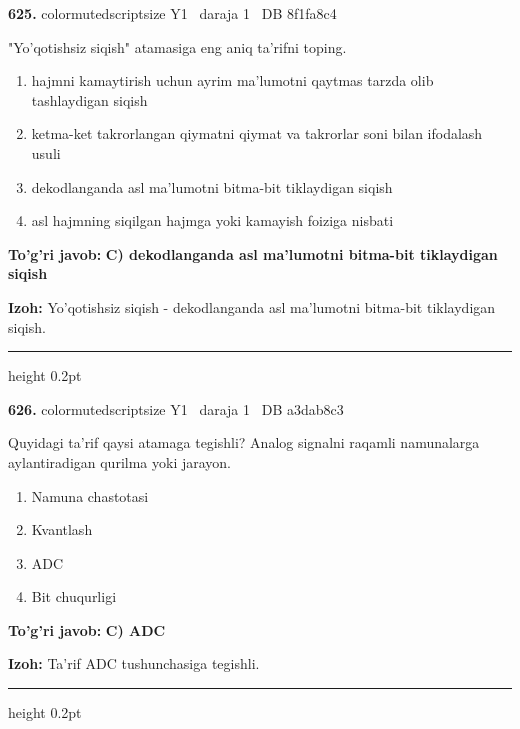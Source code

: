 \documentclass[10pt,a4paper,oneside]{article}
\begin{document}
\noindent\textbf{\color{ink}625.}  {color{muted}scriptsize Y1 \textbullet\ daraja 1 \textbullet\ DB 8f1fa8c4}
\par
"Yo'qotishsiz siqish" atamasiga eng aniq ta'rifni toping.
\begin{enumerate}[label=\Alph*),leftmargin=9mm]
\item hajmni kamaytirish uchun ayrim ma'lumotni qaytmas tarzda olib tashlaydigan siqish
\item ketma-ket takrorlangan qiymatni qiymat va takrorlar soni bilan ifodalash usuli
\item dekodlanganda asl ma'lumotni bitma-bit tiklaydigan siqish
\item asl hajmning siqilgan hajmga yoki kamayish foiziga nisbati
\end{enumerate}
\begin{tcolorbox}[enhanced,breakable,colback=teal!4,colframe=teal!50!black,boxrule=0.5pt,arc=1.1mm,left=3mm,right=3mm,top=1.7mm,bottom=1.7mm,before skip=2mm,after skip=2mm]
\textbf{\color{teal}To'g'ri javob:} \textbf{C) dekodlanganda asl ma'lumotni bitma-bit tiklaydigan siqish}
\par\smallskip
\textbf{Izoh:} Yo'qotishsiz siqish - dekodlanganda asl ma'lumotni bitma-bit tiklaydigan siqish.
\end{tcolorbox}
\vspace{2mm}\hrule height 0.2pt \vspace{3mm}

\noindent\textbf{\color{ink}626.}  {color{muted}scriptsize Y1 \textbullet\ daraja 1 \textbullet\ DB a3dab8c3}
\par
Quyidagi ta'rif qaysi atamaga tegishli? Analog signalni raqamli namunalarga aylantiradigan qurilma yoki jarayon.
\begin{enumerate}[label=\Alph*),leftmargin=9mm]
\item Namuna chastotasi
\item Kvantlash
\item ADC
\item Bit chuqurligi
\end{enumerate}
\begin{tcolorbox}[enhanced,breakable,colback=teal!4,colframe=teal!50!black,boxrule=0.5pt,arc=1.1mm,left=3mm,right=3mm,top=1.7mm,bottom=1.7mm,before skip=2mm,after skip=2mm]
\textbf{\color{teal}To'g'ri javob:} \textbf{C) ADC}
\par\smallskip
\textbf{Izoh:} Ta'rif ADC tushunchasiga tegishli.
\end{tcolorbox}
\vspace{2mm}\hrule height 0.2pt \vspace{3mm}
\end{document}
